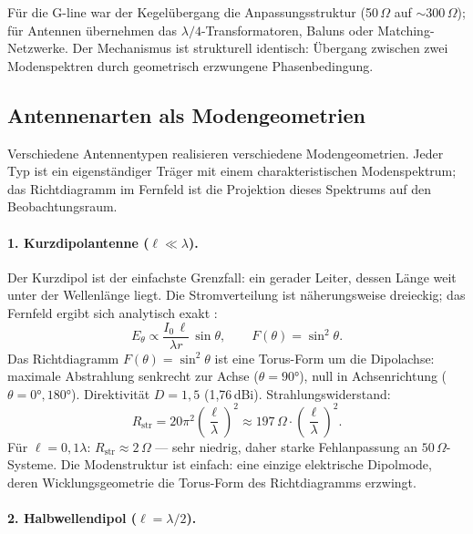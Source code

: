 Für die G-line war der Kegelübergang die Anpassungsstruktur (50\,$\Omega$
auf ${\sim}300\,\Omega$); für Antennen übernehmen das $\lambda/4$-Transformatoren,
Baluns oder Matching-Netzwerke. Der Mechanismus ist strukturell identisch:
Übergang zwischen zwei Modenspektren durch geometrisch erzwungene
Phasenbedingung.

\subsection*{Antennenarten als Modengeometrien}

Verschiedene Antennentypen realisieren verschiedene Modengeometrien.
Jeder Typ ist ein eigenständiger Träger mit einem charakteristischen
Modenspektrum; das Richtdiagramm im Fernfeld ist die Projektion dieses
Spektrums auf den Beobachtungsraum.

\paragraph{1. Kurzdipolantenne ($\ell \ll \lambda$).}

Der Kurzdipol ist der einfachste Grenzfall: ein gerader Leiter, dessen
Länge weit unter der Wellenlänge liegt. Die Stromverteilung ist näherungsweise
dreieckig; das Fernfeld ergibt sich analytisch exakt \EM:
\[
  E_\theta \propto \frac{I_0\,\ell}{\lambda r}\,\sin\theta,
  \qquad
  F(\theta) = \sin^2\theta.
\]
Das Richtdiagramm $F(\theta) = \sin^2\theta$ ist eine Torus-Form um die
Dipolachse: maximale Abstrahlung senkrecht zur Achse ($\theta = 90°$),
null in Achsenrichtung ($\theta = 0°, 180°$). Direktivität $D = 1{,}5$
(1,76\,dBi). Strahlungswiderstand:
\[
  R_\mathrm{str} = 20\pi^2\left(\frac{\ell}{\lambda}\right)^2 \approx 197\,\Omega
  \cdot \left(\frac{\ell}{\lambda}\right)^2.
\]
Für $\ell = 0{,}1\lambda$: $R_\mathrm{str} \approx 2\,\Omega$ --- sehr
niedrig, daher starke Fehlanpassung an $50\,\Omega$-Systeme. Die
Modenstruktur ist einfach: eine einzige elektrische Dipolmode, deren
Wicklungsgeometrie die Torus-Form des Richtdiagramms erzwingt.

\paragraph{2. Halbwellendipol ($\ell = \lambda/2$).}

